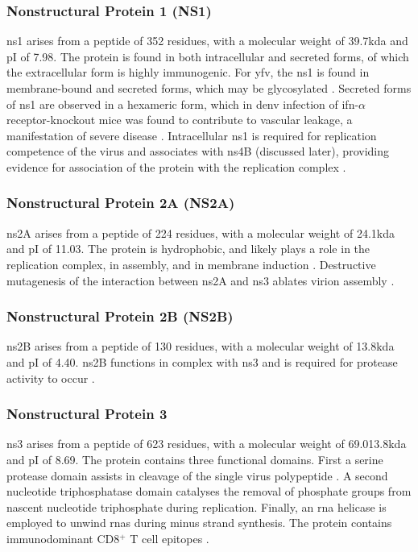 \subsubsection{Nonstructural Protein 1 (NS1)}
\Gls{ns}1 arises from a peptide of 352 residues, with a molecular weight of 39.7\gls{kda} and pI of 7.98. The protein is found in both intracellular and secreted forms, of which the extracellular form is highly immunogenic. For \gls{yfv}, the \gls{ns}1 is found in membrane-bound \parencite{Schlesinger:1990hh} and secreted forms, which may be glycosylated \parencite{Post:1991vg}. Secreted forms of \gls{ns}1 are observed in a hexameric form, which in \gls{denv} infection of \gls{ifn}-$\alpha$ receptor-knockout mice was found to contribute to vascular leakage, a manifestation of severe disease \parencite{Beatty:2015it}. Intracellular \gls{ns}1 is required for replication competence of the virus and associates with \gls{ns}4B (discussed later), providing evidence for association of the protein with the replication complex \parencite{Youn:2012jt, Youn:2013hj}. 

\subsubsection{Nonstructural Protein 2A (NS2A)}
\Gls{ns}2A arises from a peptide of 224 residues, with a molecular weight of 24.1\gls{kda} and pI of 11.03. The protein is hydrophobic, and likely plays a role in
the replication complex, in assembly, and in membrane induction \parencite{Leung:2008cv}. Destructive mutagenesis of the interaction between \gls{ns}2A and \gls{ns}3 ablates virion assembly \parencite{Vobmann:2015dy}. 

\subsubsection{Nonstructural Protein 2B (NS2B)}
\Gls{ns}2B arises from a peptide of 130 residues, with a molecular weight of 13.8\gls{kda} and pI of 4.40. \gls{ns}2B functions in complex with \gls{ns}3 and is required for protease activity to occur \parencite{Monath:2013cu}.

\subsubsection{Nonstructural Protein 3}
\Gls{ns}3 arises from a peptide of 623 residues, with a molecular weight of 69.013.8\gls{kda} and pI of 8.69. The protein contains three functional domains. First a serine protease domain assists in cleavage of the single virus polypeptide \parencite{Monath:2013cu}. A second nucleotide triphosphatase domain catalyses the removal of phosphate groups from nascent nucleotide triphosphate during replication. Finally, an \gls{rna} helicase is employed to unwind \glspl{rna} during minus strand synthesis. The protein contains immunodominant CD8$^+$ T cell epitopes \parencite{vanderMost:2002eo}. 

